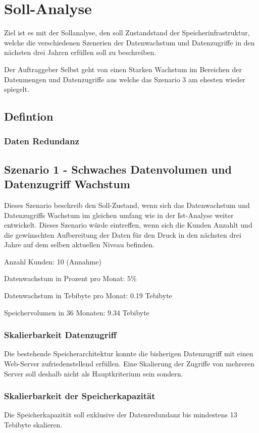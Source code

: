 
\cleardoublepage
\chapter{Soll-Analyse}
Ziel ist es mit der Sollanalyse, den soll Zustandstand der Speicherinfrastruktur, welche die verschiedenen Szenerien der Datenwachstum und Datenzugriffe in den nächsten drei Jahren erfüllen soll zu beschreiben. 

Der Auftraggeber Selbst geht von einen Starken Wachstum im Bereichen der Datenmengen und Datenzugriffe aus welche das Szenario 3 am ehesten wieder spiegelt.

\section{Defintion}
\subsection{Daten Redundanz}


\section{Szenario 1 - Schwaches Datenvolumen und Datenzugriff Wachstum}
Dieses Szenario beschreib den Soll-Zustand, wenn sich das Datenwachstum und Datenzugriffs Wachstum im gleichen umfang wie in der Ist-Analyse weiter entwickelt. Dieses Szenario würde eintreffen, wenn sich die Kunden Anzahlt und die gewünschten Aufbereitung der Daten für den Druck in den nächsten drei Jahre auf dem selben aktuellen Niveau befinden.

Anzahl Kunden: 10 (Annahme)

Datenwachstum in Prozent pro Monat: 5\% 

Datenwachstum in Tebibyte pro Monat: 0.19 Tebibyte

Speichervolumen in 36 Monaten: 9.34 Tebibyte

\subsection{Skalierbarkeit Datenzugriff}
Die bestehende Speicherarchitektur konnte die bisherigen Datenzugriff mit einen Web-Server zufriedenstellend erfüllen. Eine Skalierung der Zugriffe von mehreren Server soll deshalb nicht als Hauptkriterium sein sondern.

\subsection{Skalierbarkeit der Speicherkapazität}
Die Speicherkapazität soll exklusive der Datenredundanz bis mindestens 13 Tebibyte skalieren.

